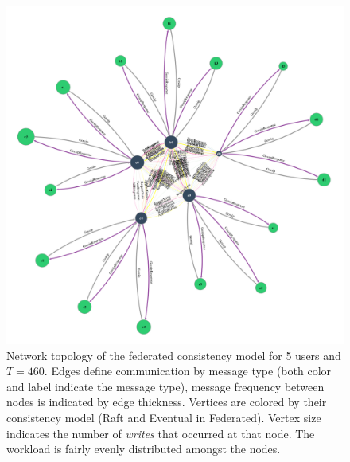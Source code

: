 \documentclass[10pt,letterpaper]{article}
\begin{document}
\begin{figure}[!h]
    \centering
        \includegraphics[width=\textwidth]{figures/federated-T460.png}
        \caption{\textsf{Network topology of the federated consistency model for 5 users and $T=460$. Edges define communication by message type (both color and label indicate the message type), message frequency between nodes is indicated by edge thickness. Vertices are colored by their consistency model (Raft and Eventual in Federated). Vertex size indicates the number of \textit{writes} that occurred at that node. The workload is fairly evenly distributed amongst the nodes.}}
        \label{fig:topology}
\end{figure}
\end{document}
